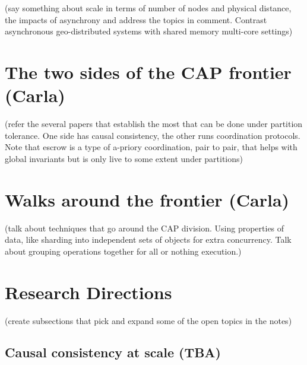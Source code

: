 \documentclass[
graybox,
envcountchap,
]{svmult}
\begin{document}
\begin{bibunit}
        (say something about scale in terms of number of nodes and physical distance, the impacts of asynchrony and address the topics in comment. Contrast asynchronous geo-distributed systems with shared memory multi-core settings)

        \section{The two sides of the CAP frontier (Carla)}\label{sec:2}


        (refer the several papers that establish the most that can be done under partition tolerance. One side has causal consistency, the other runs coordination protocols. Note that escrow is a type of a-priory coordination, pair to pair, that helps with global invariants but is only live to some extent under partitions)

        \section{Walks around the frontier (Carla)}\label{sec:2}


        (talk about techniques that go around the CAP division. Using properties of data, like sharding into independent sets of objects for extra concurrency. Talk about grouping operations together for all or nothing execution.)

        \section{Research Directions}\label{sec:2}

        (create subsections that pick and expand some of the open topics in the notes)

        \subsection{Causal consistency at scale (TBA)}


\end{bibunit}
\end{document}
